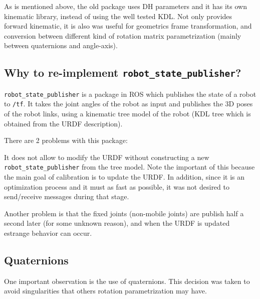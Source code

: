 As is mentioned above, the old package uses DH parameters and it has its own kinematic library, instead of using the well tested KDL. Not only provides forward kinematic, it is also was useful for geometrics frame transformation, and conversion between different kind of rotation matrix parametrization (mainly between quaternions and angle-axis).



\subsection{Why to re-implement \texttt{robot\_state\_publisher}?}

\texttt{robot\_state\_publisher} is a package in ROS which publishes the state of a robot to \texttt{/tf}. It takes the joint angles of the robot as input and publishes the 3D poses of the robot links, using a kinematic tree model of the robot (KDL tree which is obtained from the URDF description).

There are 2 problems with this package:
\begin{itemize*}
 \item It does not allow to modify the URDF without constructing a new \texttt{robot\_state\_publisher} from the tree model. Note the important of this because the main goal of calibration is to update the URDF. In addition, since it is an optimization process and it must as fast as possible, it was not desired to send/receive messages during that stage.

 \item Another problem is that the fixed joints (non-mobile joints) are publish half a second later (for some unknown reason), and when the URDF is updated estrange behavior can occur.
\end{itemize*}

%
%
%
%
%

\subsection{Quaternions}

One important observation is the use of quaternions. This decision was taken to avoid singularities that others rotation parametrization may have.

